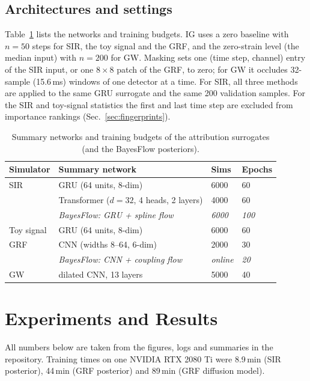 \documentclass[conference]{IEEEtran}
\begin{document}
\subsection{Architectures and settings}

Table~\ref{tab:setup} lists the networks and training budgets. IG uses a zero baseline with $n=50$ steps for SIR,
the toy signal and the GRF, and the zero-strain level (the median input) with $n=200$ for GW. Masking sets one
(time step, channel) entry of the SIR input, or one $8\times8$ patch of the GRF, to zero; for GW it occludes
32-sample (15.6\,ms) windows of one detector at a time. For SIR, all three methods are applied to the same
GRU surrogate and the same 200 validation samples. For the SIR and toy-signal statistics the first and last time step are
excluded from importance rankings (Sec.~\ref{sec:fingerprints}).

\begin{table}[!tb]
\centering
\caption{Summary networks and training budgets of the attribution surrogates (and the BayesFlow posteriors).}
\label{tab:setup}
\footnotesize
\setlength{\tabcolsep}{3.5pt}
\begin{tabular}{@{}llll@{}}
\toprule
Simulator & Summary network & Sims & Epochs \\
\midrule
SIR & GRU (64 units, 8-dim) & 6000 & 60 \\
    & Transformer ($d{=}32$, 4 heads, 2 layers) & 4000 & 60 \\
    & \textit{BayesFlow: GRU + spline flow} & \textit{6000} & \textit{100} \\
Toy signal & GRU (64 units, 8-dim) & 6000 & 60 \\
GRF & CNN (widths 8--64, 6-dim) & 2000 & 30 \\
    & \textit{BayesFlow: CNN + coupling flow} & \textit{online} & \textit{20} \\
GW & dilated CNN, 13 layers~\cite{hermans2022trust} & 5000 & 40 \\
\bottomrule
\end{tabular}
\end{table}

\section{Experiments and Results}

All numbers below are taken from the figures, logs and summaries in the repository. Training times on one
NVIDIA RTX 2080 Ti were 8.9\,min (SIR posterior), 44\,min (GRF posterior) and 89\,min (GRF diffusion model).
\end{document}

